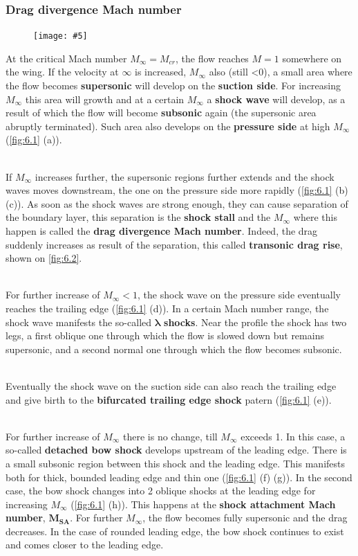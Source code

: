 \documentclass[british,french,11pt, a4paper, openany]{article}
\newcommand{\wrapfig}[6]{%
	\begin{figure}%
		\vspace{-5mm}%
		\texttt{[image: \#5]}%
		\captionof{figure}{}%
		\label{#6}%
	\end{figure}%
}
\begin{document}
\subsubsection{Drag divergence Mach number}
\wrapfig{22}{l}{4.5}{0.2}{ch6/1}{fig:6.1}
At the critical Mach number $M_\infty = M_{cr}$, the flow reaches $M=1$ somewhere on the wing. If the velocity at $\infty$ is increased, $M_\infty$ also (still <0), a small area where the flow becomes \textbf{supersonic} will develop on the \textbf{suction side}. For increasing $M_\infty$ this area will growth and at a certain $M_\infty$ a \textbf{shock wave} will develop, as a result of which the flow will become \textbf{subsonic} again (the supersonic area abruptly terminated). Such area also develops on the \textbf{pressure side} at high $M_\infty$ (\autoref{fig:6.1} (a)).

\ \\ If $M_\infty$ increases further, the supersonic regions further extends and the shock waves moves downstream, the one on the pressure side more rapidly (\autoref{fig:6.1} (b) (c)). As soon as the shock waves are strong enough, they can cause separation of the boundary layer, this separation is the \textbf{shock stall} and the $M_\infty$ where this happen is called the \textbf{drag divergence Mach number}. Indeed, the drag suddenly increases as result of the separation, this called \textbf{transonic drag rise}, shown on \autoref{fig:6.2}. 

\ \\ For further increase of $M_\infty <1$, the shock wave on the pressure side eventually reaches the trailing edge (\autoref{fig:6.1} (d)). In a certain Mach number range, the shock wave manifests the so-called $\bm{\lambda}$ \textbf{shocks}. Near the profile the shock has two legs, a first oblique one through which the flow is slowed down but remains supersonic, and a second normal one through which the flow becomes subsonic. 

\ \\ Eventually the shock wave on the suction side can also reach the trailing edge and give birth to the \textbf{bifurcated trailing edge shock} patern (\autoref{fig:6.1} (e)). 

\ \\ For further increase of $M_\infty$ there is no change, till $M_\infty$ exceeds 1. In this case, a so-called \textbf{detached bow shock} develops upstream of the leading edge. There is a small subsonic region between this shock and the leading edge. This manifests both for thick, bounded leading edge and thin one (\autoref{fig:6.1} (f) (g)). In the second case, the bow shock changes into 2 oblique shocks at the leading edge for increasing $M_\infty$ (\autoref{fig:6.1} (h)). This happens at the \textbf{shock attachment Mach number}, $\bm{M_{SA}}$. For further $M_{\infty}$, the flow becomes fully supersonic and the drag decreases. In the case of rounded leading edge, the bow shock continues to exist and comes closer to the leading edge. 
\end{document}
